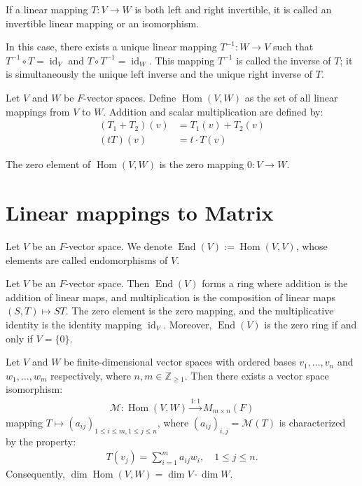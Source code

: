 \begin{definition}
  If a linear mapping $T: V \rightarrow W$ is both left and right invertible, it is called an invertible linear mapping or an isomorphism.

  In this case, there exists a unique linear mapping $T^{-1}: W \rightarrow V$ such that $T^{-1} \circ T = \operatorname{id}_V$ and $T \circ T^{-1} = \operatorname{id}_W$. This mapping $T^{-1}$ is called the inverse of $T$; it is simultaneously the unique left inverse and the unique right inverse of $T$.
\end{definition}

\begin{definition}
  Let $V$ and $W$ be $F$-vector spaces. Define $\operatorname{Hom}(V,W)$ as the set of all linear mappings from $V$ to $W$. Addition and scalar multiplication are defined by:
  \begin{align*}
    (T_1 + T_2)(v) &= T_1(v) + T_2(v)\\
    (tT)(v) &= t \cdot T(v)
  \end{align*}

  The zero element of $\operatorname{Hom}(V,W)$ is the zero mapping $0: V \rightarrow W$.
\end{definition}

\section{Linear mappings to Matrix}

\begin{definition}
  Let $V$ be an $F$-vector space. We denote $\operatorname{End}(V) := \operatorname{Hom}(V,V)$, whose elements are called endomorphisms of $V$.
\end{definition}

\begin{corollary}
  Let $V$ be an $F$-vector space. Then $\operatorname{End}(V)$ forms a ring where addition is the addition of linear maps, and multiplication is the composition of linear maps $(S,T) \mapsto ST$. The zero element is the zero mapping, and the multiplicative identity is the identity mapping $\operatorname{id}_V$. Moreover, $\operatorname{End}(V)$ is the zero ring if and only if $V = \{0\}$.
\end{corollary}

\begin{theorem}
  Let $V$ and $W$ be finite-dimensional vector spaces with ordered bases $v_1,\ldots,v_n$ and $w_1,\ldots,w_m$ respectively, where $n,m \in \mathbb{Z}_{\geq 1}$. Then there exists a vector space isomorphism:
  \begin{align*}
    \mathcal{M}: \operatorname{Hom}(V,W) \stackrel{1:1}{\longrightarrow} M_{m\times n}(F)
  \end{align*}
  mapping $T \mapsto (a_{ij})_{1 \leq i \leq m, 1 \leq j \leq n}$, where $(a_{ij})_{i,j} = \mathcal{M}(T)$ is characterized by the property:
  \begin{align*}
    T(v_j) = \sum_{i=1}^m a_{ij}w_i, \quad 1 \leq j \leq n.
  \end{align*}
  Consequently, $\dim \operatorname{Hom}(V,W) = \dim V \cdot \dim W$.
\end{theorem}

